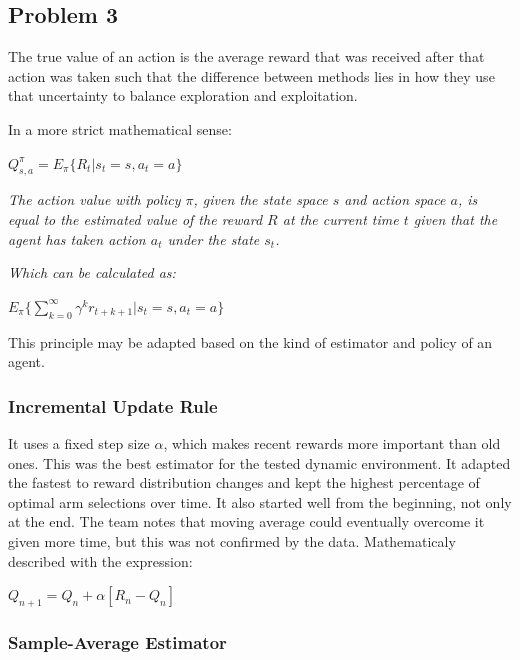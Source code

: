 \documentclass[11pt]{article}
\begin{document}
\subsection*{Problem 3}

The true value of an action is the average reward that was received after that action was taken such that the difference between methods lies in how they use that uncertainty to balance exploration and exploitation.

\bigskip

In a more strict mathematical sense:

\begin{center}
  $Q^{\pi}_{s, a} = E_{\pi}\{ R_{t} | s_{t}=s, a_{t} = a \}$ \\
  \bigskip

  \textit{The action value with policy $\pi$, given the state space $s$ and action space $a$, is equal to the estimated value of the reward $R$ at the current time $t$ given that the agent has taken action $a_{t}$ under the state $s_{t}$.} \\ 
  \bigskip

  \textit{Which can be calculated as:}
  \bigskip

  $E_{\pi}\{ \sum_{k = 0}^{\infty} \gamma^{k}r_{t+k+1} | s_{t}=s, a_{t} = a  \} $

\end{center}

This principle may be adapted based on the kind of estimator and policy of an agent.

\subsubsection*{Incremental Update Rule}

It uses a fixed step size $\alpha $, which makes recent rewards more important than old ones. This was the best estimator for the tested dynamic environment. It adapted the fastest to reward distribution changes and kept the highest percentage of optimal arm selections over time. It also started well from the beginning, not only at the end. The team notes that moving average could eventually overcome it given more time, but this was not confirmed by the data. Mathematicaly described with the expression:

\bigskip

\begin{center}
  $Q_{n+1} = Q_n + \alpha [R_n - Q_n]$
\end{center}
\subsubsection*{Sample-Average Estimator}
\end{document}
